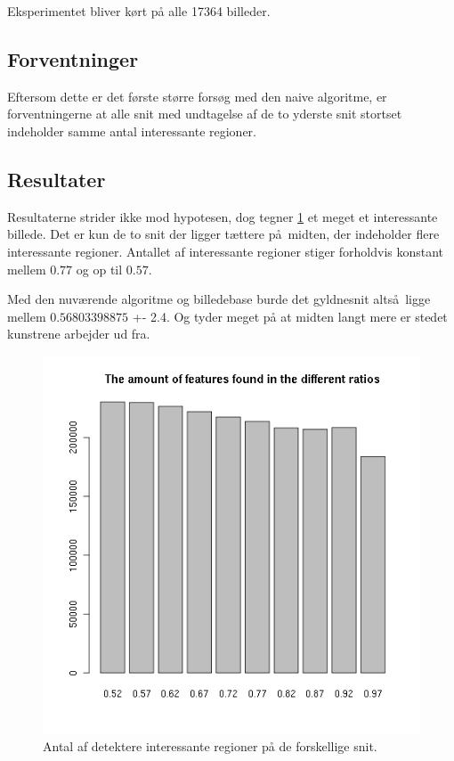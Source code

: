 {Eksperimentet bliver kørt på alle 17364 billeder.
\newpage
\subsection{Forventninger}
Eftersom dette er det første større forsøg med den naive algoritme, er
forventningerne at alle snit med undtagelse af de to yderste snit
stortset indeholder samme antal interessante regioner.

\subsection{Resultater}
Resultaterne strider ikke mod hypotesen, dog tegner \ref{diffratios}
et meget et interessante billede. Det er kun de to snit der ligger
tættere på midten, der indeholder flere interessante regioner.
Antallet af interessante regioner stiger forholdvis konstant mellem
$0.77$ og op til $0.57$.

Med den nuværende algoritme og billedebase burde det gyldnesnit
altså ligge mellem $0.56803398875$ +- 2.4.
Og tyder meget på at midten langt mere er stedet kunstrene arbejder
ud fra.
\begin{figure}[h!]
	\begin{center}
		\includegraphics[scale=0.5]{afsnit/resultater/billeder/featsperratio.png}
	\end{center}
	\caption{Antal af detektere interessante regioner på de forskellige snit.}
	\label{diffratios}
\end{figure}


}
